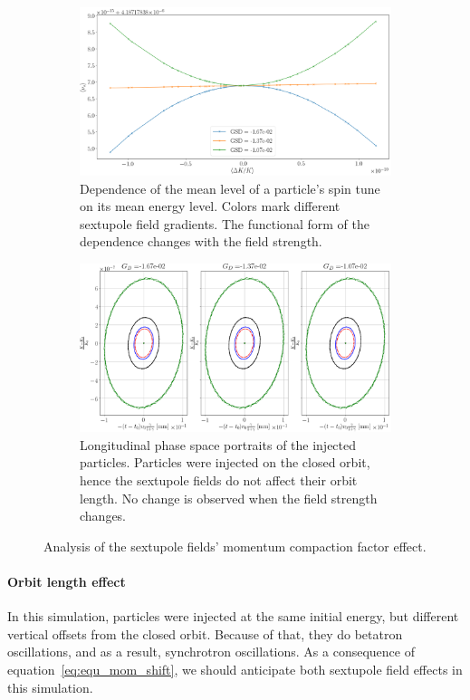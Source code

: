 \documentclass[]{elsarticle}
\begin{document}
\begin{figure}[h]\centering
  \begin{subfigure}{\linewidth}
    \includegraphics[width=\linewidth]{img/decoh/STDK_3SS_D}
    \caption{Dependence of the mean level of a particle's spin tune on its mean energy level.
      Colors mark different sextupole field gradients.
      The functional form of the dependence changes with the field strength.\label{fig:sext:MCM_effect}}
  \end{subfigure}
  \begin{subfigure}{\linewidth}
    \includegraphics[width=\linewidth]{img/decoh/LPS_3SS_D}
    \caption{Longitudinal phase space portraits of the injected particles.
      Particles were injected on the closed orbit, hence the sextupole fields do not affect their orbit length.
      No change is observed when the field strength changes.\label{fig:sext:MCM_effect:LPS}}
  \end{subfigure}
  \caption{Analysis of the sextupole fields' momentum compaction factor effect.}
\end{figure}

\paragraph{Orbit length effect}
In this simulation, particles were injected at the same initial energy, but different vertical offsets
from the closed orbit. Because of that, they do betatron oscillations, and as a result, synchrotron oscillations.
As a consequence of equation~\eqref{eq:equ_mom_shift}, we should anticipate both sextupole field effects
in this simulation.
\end{document}
